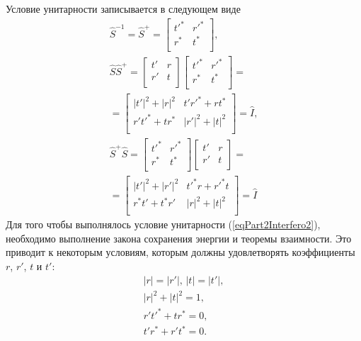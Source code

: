 Условие унитарности записывается в следующем виде
\begin{eqnarray}
\hat{S}^{-1} = 
\hat{S}^{+} =
\begin{bmatrix}
t'^\ast & r'^\ast \\
r^\ast & t^\ast \\
\end{bmatrix}, 
\nonumber \\
\hat{S} \hat{S}^{+} =
\begin{bmatrix}
t' & r \\
r' & t \\
\end{bmatrix}
\begin{bmatrix}
t'^\ast & r'^\ast \\
r^\ast & t^\ast \\
\end{bmatrix} =
\nonumber \\
=
\begin{bmatrix}
\left|t'\right|^2 + \left|r\right|^2 & t' r'^\ast + r t^\ast \\
r' t'^\ast + t r^\ast & \left|r'\right|^2 + \left|t\right|^2 \\
\end{bmatrix} = 
\hat{I},
\nonumber \\
\hat{S}^{+} \hat{S} =
\begin{bmatrix}
t'^\ast & r'^\ast \\
r^\ast & t^\ast \\
\end{bmatrix}
\begin{bmatrix}
t' & r \\
r' & t \\
\end{bmatrix}
 =
\nonumber \\
=
\begin{bmatrix}
\left|t'\right|^2 + \left|r'\right|^2 & t'^\ast r + r'^\ast t \\
r^\ast t' + t^\ast r' & \left|r\right|^2 + \left|t\right|^2 \\
\end{bmatrix} = 
\hat{I}
\label{eqPart2Interfero2}
\end{eqnarray}
Для того чтобы выполнялось условие унитарности
(\ref{eqPart2Interfero2}), необходимо выполнение закона сохранения
энергии и теоремы взаимности. Это приводит к некоторым условиям,
которым должны удовлетворять коэффициенты $r$, $r'$, $t$ и $t'$:
\begin{eqnarray}
\left|r\right| = \left|r'\right|, \, \left|t\right| = \left|t'\right|,
\nonumber \\
\left|r\right|^2 + \left|t\right|^2 = 1, 
\nonumber \\
r' t'^\ast + t r^\ast = 0,
\nonumber \\
t' r^\ast + r' t^\ast = 0.
\label{eqPart2Interfero3}
\end{eqnarray}

